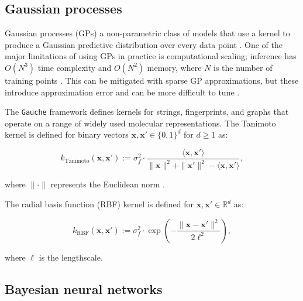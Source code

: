 \subsection{Gaussian processes}

Gaussian processes (GPs) a non-parametric class of models that use a kernel to produce a Gaussian predictive distribution over every data point \citep{Obrezanova2007, Rasmussen2005}. One of the major limitations of using GPs in practice is computational scaling; inference has $O(N^3)$ time complexity and $O(N^2)$ memory, where $N$ is the number of training points \citep{Rasmussen2005}. This can be mitigated with sparse GP approximations, but these introduce approximation error and can be more difficult to tune \citep{quinonero2005}.


The \texttt{Gauche} framework \citep{gauche} defines kernels for strings, fingerprints, and graphs that operate on a range of widely used molecular representations. The Tanimoto kernel \citep{Ralaivola2005, moss2020} is defined for binary vectors $\mathbf{x}, \mathbf{x}' \in \{0, 1\}^d$ for $d \geq 1$ as:

\begin{equation}
k_{\text{Tanimoto}}(\mathbf{x}, \mathbf{x}') := \sigma_f^2 \cdot \frac{\langle \mathbf{x}, \mathbf{x}' \rangle}{\|\mathbf{x}\|^2 + \|\mathbf{x}'\|^2 - \langle \mathbf{x}, \mathbf{x}' \rangle},
\label{eq:tanimoto_kernel}
\end{equation}

where $\|\cdot\|$ represents the Euclidean norm \citep{gauche}. 

The radial basis function (RBF) kernel is defined for
$\mathbf{x}, \mathbf{x}' \in \mathbb{R}^d$ as:

\begin{equation}
k_{\text{RBF}}(\mathbf{x}, \mathbf{x}') := \sigma_f^2 \cdot \exp\left(-\frac{\|\mathbf{x} - \mathbf{x}'\|^2}{2\ell^2}\right),
\end{equation}

where $\ell$ is the lengthscale.


\subsection{Bayesian neural networks}

